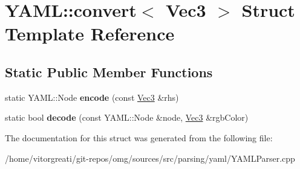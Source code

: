 \hypertarget{struct_y_a_m_l_1_1convert_3_01_vec3_01_4}{}\section{Y\+A\+ML\+::convert$<$ Vec3 $>$ Struct Template Reference}
\label{struct_y_a_m_l_1_1convert_3_01_vec3_01_4}
\subsection*{Static Public Member Functions}
\begin{DoxyCompactItemize}
\item 
\mbox{\label{struct_y_a_m_l_1_1convert_3_01_vec3_01_4_abd871b7fceb968dd561ff5178a6eab45}} 
static Y\+A\+M\+L\+::\+Node {\bfseries encode} (const \mbox{\hyperlink{namespaceomg_a45a9482677fee9933ff369b49894e316}{Vec3}} \&rhs)
\item 
\mbox{\label{struct_y_a_m_l_1_1convert_3_01_vec3_01_4_a7d717f558a40901c152735213df1b35a}} 
static bool {\bfseries decode} (const Y\+A\+M\+L\+::\+Node \&node, \mbox{\hyperlink{namespaceomg_a45a9482677fee9933ff369b49894e316}{Vec3}} \&rgb\+Color)
\end{DoxyCompactItemize}


The documentation for this struct was generated from the following file\+:\begin{DoxyCompactItemize}
\item 
/home/vitorgreati/git-\/repos/omg/sources/src/parsing/yaml/Y\+A\+M\+L\+Parser.\+cpp\end{DoxyCompactItemize}
